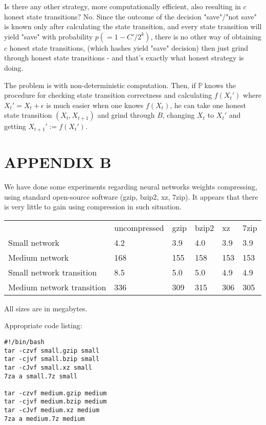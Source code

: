 \documentclass{winnower}
\newcommand{\X}{$\mathbb{P\ }$}
\begin{document}
Is there any other strategy, more computationally efficient, also resulting in $c$ honest state transitions?
No. Since the outcome of the decision "save"/"not save" is known only after calculating the state transition, and every state transition will yield "save" with probability $p (= 1 - C'/2^{k})$, there is no other way of obtaining $c$ honest state transitions, (which hashes yield "save" decision) then just grind through honest state transitions - and that's exactly what honest strategy is doing. 

The problem is with non-deterministic computation. Then, if \X knows the procedure for checking state transition correctness and calculating $f(X_t')$ where $X_t' = X_t + \epsilon$ is much easier when one knows $f(X_t)$, he can take one honest state transition $(X_t, X_{t+1})$ and grind through $B$, changing $X_t$ to $X_t'$ and getting $X_{t+1}' := f(X_t')$.

\newpage
\section*{APPENDIX B}

We have done some experiments regarding neural networks weights compressing, using standard open-source software (gzip, bzip2, xz, 7zip). It appears that there is very little to gain using compression in such situation.

\begin{table}[!htb]
\centering
\begin{tabular}{llllll}
                          & uncompressed & gzip & bzip2 & xz  & 7zip \\
Small network             & 4.2          & 3.9  & 4.0   & 3.9 & 3.9  \\
Medium network            & 168          & 155  & 158   & 153 & 153  \\
Small network transition  & 8.5          & 5.0  & 5.0   & 4.9 & 4.9  \\
Medium network transition & 336          & 309  & 315   & 306 & 305 
\end{tabular}
\end{table}
All sizes are in megabytes.

Appropriate code listing:

\begin{lstlisting}
#!/bin/bash
tar -czvf small.gzip small
tar -cjvf small.bzip small
tar -cJvf small.xz small
7za a small.7z small

tar -czvf medium.gzip medium
tar -cjvf medium.bzip medium
tar -cJvf medium.xz medium
7za a medium.7z medium
\end{lstlisting}
\end{document}
